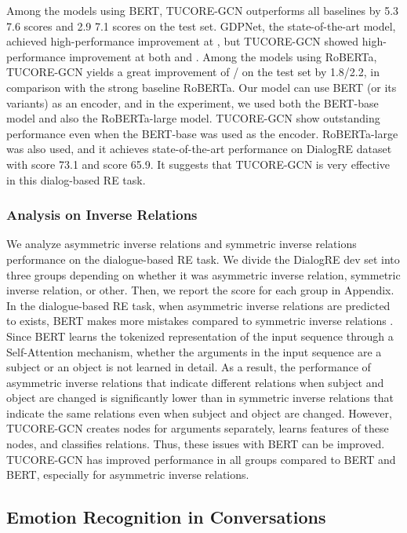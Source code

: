 \documentclass[11pt]{article}
\begin{document}
Among the models using BERT, TUCORE-GCN outperforms all baselines by 5.3  7.6  scores and 2.9  7.1  scores on the test set. GDPNet, the state-of-the-art model, achieved high-performance improvement at , but TUCORE-GCN showed high-performance improvement at both  and . Among the models using RoBERTa, TUCORE-GCN yields a great improvement of / on the test set by 1.8/2.2, in comparison with the strong baseline RoBERTa. Our model can use BERT (or its variants) as an encoder, and in the experiment, we used both the BERT-base model and also the RoBERTa-large model. TUCORE-GCN show outstanding performance even when the BERT-base was used as the encoder. RoBERTa-large was also used, and it achieves state-of-the-art performance on DialogRE dataset with  score 73.1 and  score 65.9. It suggests that TUCORE-GCN is very effective in this dialog-based RE task.



\subsubsection{Analysis on Inverse Relations}
\label{ssec:Analysis}
We analyze asymmetric inverse relations and symmetric inverse relations performance on the dialogue-based RE task. We divide the DialogRE dev set into three groups depending on whether it was asymmetric inverse relation, symmetric inverse relation, or other. Then, we report the  score for each group in Appendix. In the dialogue-based RE task, when asymmetric inverse relations are predicted to exists, BERT makes more mistakes compared to symmetric inverse relations \citep{yu-etal-2020-dialogue}. Since BERT learns the tokenized representation of the input sequence through a Self-Attention mechanism, whether the arguments in the input sequence are a subject or an object is not learned in detail. As a result, the performance of asymmetric inverse relations that indicate different relations when subject and object are changed is significantly lower than in symmetric inverse relations that indicate the same relations even when subject and object are changed. 
However, TUCORE-GCN creates nodes for arguments separately, learns features of these nodes, and classifies relations.
Thus, these issues with BERT can be improved. TUCORE-GCN has improved performance in all groups compared to BERT and BERT, especially for asymmetric inverse relations.


\subsection{Emotion Recognition in Conversations}
\end{document}
